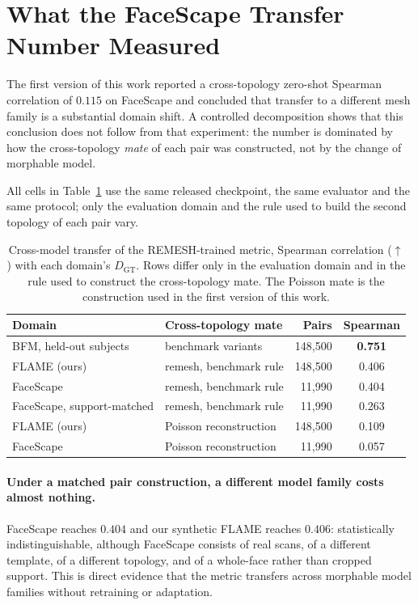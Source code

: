 \documentclass{article}
\begin{document}
\section{What the FaceScape Transfer Number Measured}
\label{sec:supp_transfer}

The first version of this work reported a cross-topology zero-shot Spearman correlation
of $0.115$ on FaceScape and concluded that transfer to a different mesh family is a
substantial domain shift. A controlled decomposition shows that this conclusion does not
follow from that experiment: the number is dominated by how the cross-topology
\emph{mate} of each pair was constructed, not by the change of morphable model.

All cells in Table~\ref{tab:supp_transfer} use the same released checkpoint, the same
evaluator and the same protocol; only the evaluation domain and the rule used to build
the second topology of each pair vary.

\begin{table}[!ht]
\centering
\small
\caption{Cross-model transfer of the REMESH-trained metric, Spearman correlation
($\uparrow$) with each domain's $D_{\mathrm{GT}}$. Rows differ only in the evaluation
domain and in the rule used to construct the cross-topology mate. The Poisson mate is
the construction used in the first version of this work.}
\label{tab:supp_transfer}
\begin{tabular}{llrc}
\toprule
Domain & Cross-topology mate & Pairs & Spearman \\
\midrule
BFM, held-out subjects        & benchmark variants        & 148{,}500 & \textbf{0.751} \\
\midrule
FLAME (ours)                  & remesh, benchmark rule    & 148{,}500 & 0.406 \\
FaceScape                     & remesh, benchmark rule    &  11{,}990 & 0.404 \\
FaceScape, support-matched    & remesh, benchmark rule    &  11{,}990 & 0.263 \\
\midrule
FLAME (ours)                  & Poisson reconstruction    & 148{,}500 & 0.109 \\
FaceScape                     & Poisson reconstruction    &  11{,}990 & 0.057 \\
\bottomrule
\end{tabular}
\end{table}

\paragraph{Under a matched pair construction, a different model family costs almost nothing.}
FaceScape reaches $0.404$ and our synthetic FLAME reaches $0.406$: statistically
indistinguishable, although FaceScape consists of real scans, of a different template,
of a different topology, and of a whole-face rather than cropped support. This is direct
evidence that the metric transfers across morphable model families without retraining or
adaptation.
\end{document}
